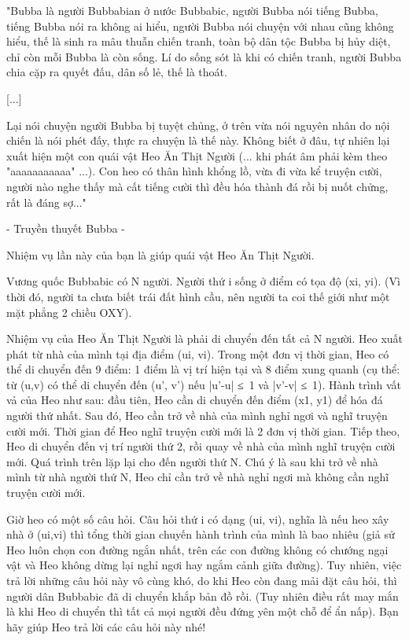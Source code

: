 "Bubba là người Bubbabian ở nước Bubbabic, người Bubba nói tiếng Bubba, tiếng Bubba nói ra không ai hiểu, người Bubba nói chuyện với nhau cũng không hiểu, thế là sinh ra mâu thuẫn chiến tranh, toàn bộ dân tộc Bubba bị hủy diệt, chỉ còn mỗi Bubba là còn sống. Lí do sống sót là khi có chiến tranh, người Bubba chia cặp ra quyết đấu, dân số lẻ, thế là thoát.

[...]

    Lại nói chuyện người Bubba bị tuyệt chủng, ở trên vừa nói nguyên nhân do nội chiến là nói phét đấy, thực ra chuyện là thế này. Không biết ở đâu, tự nhiên lại xuất hiện một con quái vật Heo Ăn Thịt Người (... khi phát âm phải kèm theo "aaaaaaaaaaa" ...). Con heo có thân hình khổng lồ, vừa đi vừa kể truyện cười, người nào nghe thấy mà cất tiếng cười thì đều hóa thành đá rồi bị nuốt chửng, rất là đáng sợ..."   

- Truyền thuyết Bubba -

   Nhiệm vụ lần này của bạn là giúp quái vật Heo Ăn Thịt Người.  

   Vương quốc Bubbabic có N người. Người thứ i sống ở điểm có tọa độ (xi, yi). (Vì thời đó, người ta chưa biết trái đất hình cầu, nên người ta coi thế giới như một mặt phẳng 2 chiều OXY).  

   Nhiệm vụ của Heo Ăn Thịt Người là phải di chuyển đến tất cả N người. Heo xuất phát từ nhà của mình tại địa điểm (ui, vi). Trong một đơn vị thời gian, Heo có thể di chuyển đến 9 điểm: 1 điểm là vị trí hiện tại và 8 điểm xung quanh (cụ thể: từ (u,v) có thể di chuyển đến (u', v') nếu |u'-u| ≤ 1 và |v'-v| ≤ 1). Hành trình vất vả của Heo như sau: đầu tiên, Heo cần di chuyển đến điểm (x1, y1) để hóa đá người thứ nhất. Sau đó, Heo cần trở về nhà của mình nghỉ ngơi và nghĩ truyện cười mới. Thời gian để Heo nghĩ truyện cười mới là 2 đơn vị thời gian. Tiếp theo, Heo di chuyển đến vị trí người thứ 2, rồi quay về nhà của mình nghĩ truyện cười mới. Quá trình trên lặp lại cho đến người thứ N. Chú ý là sau khi trở về nhà mình từ nhà người thứ N, Heo chỉ cần trở về nhà nghỉ ngơi mà không cần nghĩ truyện cười mới.  

   Giờ heo có một số câu hỏi. Câu hỏi thứ i có dạng (ui, vi), nghĩa là nếu heo xây nhà ở (ui,vi) thì tổng thời gian chuyến hành trình của mình là bao nhiêu (giả sử Heo luôn chọn con đường ngắn nhất, trên các con đường không có chướng ngại vật và Heo không dừng lại nghỉ ngơi hay ngắm cảnh giữa đường). Tuy nhiên, việc trả lời những câu hỏi này vô cùng khó, do khi Heo còn đang mải đặt câu hỏi, thì người dân Bubbabic đã di chuyển khắp bản đồ rồi. (Tuy nhiên điều rất may mắn là khi Heo di chuyển thì tất cả mọi người đều đứng yên một chỗ để ẩn nấp). Bạn hãy giúp Heo trả lời các câu hỏi này nhé!